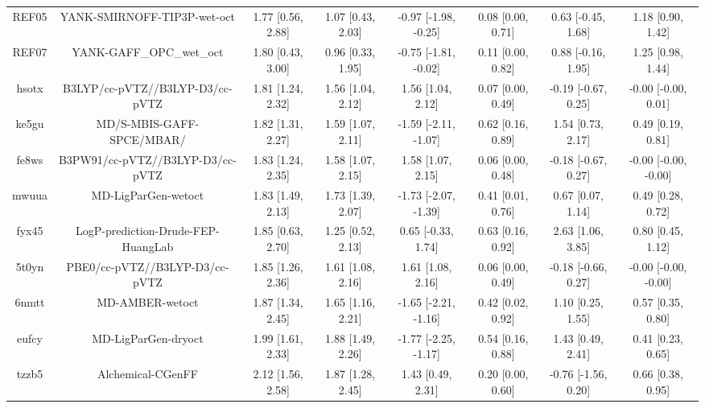 \documentclass{article}
\begin{document}
\begin{center}
\begin{longtable}{|cccccccc|}
 REF05 &                        YANK-SMIRNOFF-TIP3P-wet-oct &  1.77 [0.56, 2.88] &  1.07 [0.43, 2.03] &  -0.97 [-1.98, -0.25] &  0.08 [0.00, 0.71] &   0.63 [-0.45, 1.68] &     1.18 [0.90, 1.42] \\
 REF07 &                           YANK-GAFF\_OPC\_wet\_oct &  1.80 [0.43, 3.00] &  0.96 [0.33, 1.95] &  -0.75 [-1.81, -0.02] &  0.11 [0.00, 0.82] &   0.88 [-0.16, 1.95] &     1.25 [0.98, 1.44] \\
 hsotx &                    B3LYP/cc-pVTZ//B3LYP-D3/cc-pVTZ &  1.81 [1.24, 2.32] &  1.56 [1.04, 2.12] &     1.56 [1.04, 2.12] &  0.07 [0.00, 0.49] &  -0.19 [-0.67, 0.25] &   -0.00 [-0.00, 0.01] \\
 ke5gu &                          MD/S-MBIS-GAFF-SPCE/MBAR/ &  1.82 [1.31, 2.27] &  1.59 [1.07, 2.11] &  -1.59 [-2.11, -1.07] &  0.62 [0.16, 0.89] &    1.54 [0.73, 2.17] &     0.49 [0.19, 0.81] \\
 fe8ws &                   B3PW91/cc-pVTZ//B3LYP-D3/cc-pVTZ &  1.83 [1.24, 2.35] &  1.58 [1.07, 2.15] &     1.58 [1.07, 2.15] &  0.06 [0.00, 0.48] &  -0.18 [-0.67, 0.27] &  -0.00 [-0.00, -0.00] \\
 mwuua &                                MD-LigParGen-wetoct &  1.83 [1.49, 2.13] &  1.73 [1.39, 2.07] &  -1.73 [-2.07, -1.39] &  0.41 [0.01, 0.76] &    0.67 [0.07, 1.14] &     0.49 [0.28, 0.72] \\
 fyx45 &                 LogP-prediction-Drude-FEP-HuangLab &  1.85 [0.63, 2.70] &  1.25 [0.52, 2.13] &    0.65 [-0.33, 1.74] &  0.63 [0.16, 0.92] &    2.63 [1.06, 3.85] &     0.80 [0.45, 1.12] \\
 5t0yn &                     PBE0/cc-pVTZ//B3LYP-D3/cc-pVTZ &  1.85 [1.26, 2.36] &  1.61 [1.08, 2.16] &     1.61 [1.08, 2.16] &  0.06 [0.00, 0.49] &  -0.18 [-0.66, 0.27] &  -0.00 [-0.00, -0.00] \\
 6nmtt &                                    MD-AMBER-wetoct &  1.87 [1.34, 2.45] &  1.65 [1.16, 2.21] &  -1.65 [-2.21, -1.16] &  0.42 [0.02, 0.92] &    1.10 [0.25, 1.55] &     0.57 [0.35, 0.80] \\
 eufcy &                                MD-LigParGen-dryoct &  1.99 [1.61, 2.33] &  1.88 [1.49, 2.26] &  -1.77 [-2.25, -1.17] &  0.54 [0.16, 0.88] &    1.43 [0.49, 2.41] &     0.41 [0.23, 0.65] \\
 tzzb5 &                                  Alchemical-CGenFF &  2.12 [1.56, 2.58] &  1.87 [1.28, 2.45] &     1.43 [0.49, 2.31] &  0.20 [0.00, 0.60] &  -0.76 [-1.56, 0.20] &     0.66 [0.38, 0.95] \\

\end{longtable}
\end{center}
\end{document}
